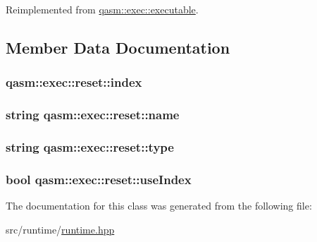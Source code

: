 Reimplemented from \hyperlink{classqasm_1_1exec_1_1executable_ad07f864a889edb0777ebbb1bc1628121}{qasm\+::exec\+::executable}.



\subsection{Member Data Documentation}
\subsubsection[{\texorpdfstring{index}{index}}]{ qasm\+::exec\+::reset\+::index}\hypertarget{classqasm_1_1exec_1_1reset_a065db6c61e42784019ccbee09add2c8f}{}\label{classqasm_1_1exec_1_1reset_a065db6c61e42784019ccbee09add2c8f}
\subsubsection[{\texorpdfstring{name}{name}}]{\setlength{\rightskip}{0pt plus 5cm}string qasm\+::exec\+::reset\+::name}\hypertarget{classqasm_1_1exec_1_1reset_a9cd21a9f3f35d4576a27b1f858b69195}{}\label{classqasm_1_1exec_1_1reset_a9cd21a9f3f35d4576a27b1f858b69195}
\subsubsection[{\texorpdfstring{type}{type}}]{\setlength{\rightskip}{0pt plus 5cm}string qasm\+::exec\+::reset\+::type}\hypertarget{classqasm_1_1exec_1_1reset_af581592e5a488d92fdbd5bf826def7ba}{}\label{classqasm_1_1exec_1_1reset_af581592e5a488d92fdbd5bf826def7ba}
\subsubsection[{\texorpdfstring{use\+Index}{useIndex}}]{\setlength{\rightskip}{0pt plus 5cm}bool qasm\+::exec\+::reset\+::use\+Index}\hypertarget{classqasm_1_1exec_1_1reset_a7fe4d5c7095a9271447cc17067ed4579}{}\label{classqasm_1_1exec_1_1reset_a7fe4d5c7095a9271447cc17067ed4579}


The documentation for this class was generated from the following file\+:\begin{DoxyCompactItemize}
\item 
src/runtime/\hyperlink{runtime_8hpp}{runtime.\+hpp}\end{DoxyCompactItemize}
